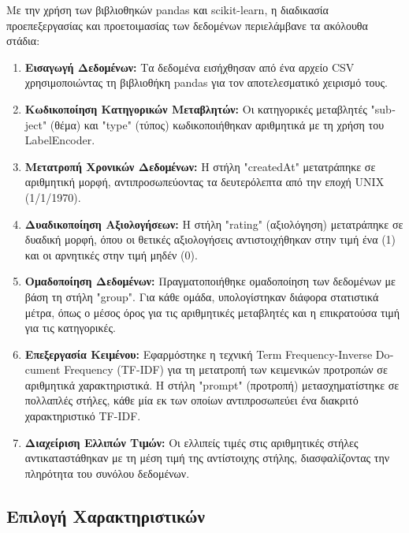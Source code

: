 Με την χρήση των βιβλιοθηκών \textlatin{pandas} και
\textlatin{scikit-learn}, η διαδικασία προεπεξεργασίας και προετοιμασίας
των δεδομένων περιελάμβανε τα ακόλουθα στάδια:
\begin{enumerate}
  \item
    \textbf{Εισαγωγή Δεδομένων:} Τα δεδομένα εισήχθησαν από ένα
    αρχείο \textlatin{CSV}
    χρησιμοποιώντας τη βιβλιοθήκη \textlatin{pandas} για τον αποτελεσματικό
    χειρισμό τους.
  \item
    \textbf{Κωδικοποίηση Κατηγορικών Μεταβλητών:} Οι κατηγορικές
    μεταβλητές "\textlatin{subject}" (θέμα) και "\textlatin{type}" (τύπος)
    κωδικοποιήθηκαν αριθμητικά με τη χρήση του \textlatin{LabelEncoder}.

  \item
    \textbf{Μετατροπή Χρονικών Δεδομένων:} Η στήλη \textlatin{"createdAt"}
    μετατράπηκε σε αριθμητική μορφή, αντιπροσωπεύοντας τα δευτερόλεπτα από
    την εποχή \textlatin{UNIX} (1/1/1970).

  \item
    \textbf{Δυαδικοποίηση Αξιολογήσεων:} Η στήλη \textlatin{"rating"}
    (αξιολόγηση) μετατράπηκε σε δυαδική μορφή, όπου οι θετικές
    αξιολογήσεις αντιστοιχήθηκαν στην τιμή ένα (1) και οι αρνητικές στην
    τιμή μηδέν (0).

  \item
    \textbf{Ομαδοποίηση Δεδομένων:} Πραγματοποιήθηκε ομαδοποίηση των
    δεδομένων με βάση τη στήλη \textlatin{"group"}. Για κάθε ομάδα,
    υπολογίστηκαν διάφορα στατιστικά μέτρα, όπως ο μέσος όρος για τις
    αριθμητικές μεταβλητές και η επικρατούσα τιμή για τις κατηγορικές.

  \item
    \textbf{Επεξεργασία Κειμένου:} Εφαρμόστηκε η τεχνική \textlatin{Term
    Frequency-Inverse Document Frequency (TF-IDF)} για τη μετατροπή των
    κειμενικών προτροπών σε αριθμητικά χαρακτηριστικά. Η στήλη
    \textlatin{"prompt"} (προτροπή) μετασχηματίστηκε σε πολλαπλές στήλες,
    κάθε μία εκ των οποίων αντιπροσωπεύει ένα διακριτό χαρακτηριστικό
    \textlatin{TF-IDF}.

  \item
    \textbf{Διαχείριση Ελλιπών Τιμών:} Οι ελλιπείς τιμές στις αριθμητικές
    στήλες αντικαταστάθηκαν με τη μέση τιμή της αντίστοιχης στήλης,
    διασφαλίζοντας την πληρότητα του συνόλου δεδομένων.
\end{enumerate}

\subsection{Επιλογή Χαρακτηριστικών}

